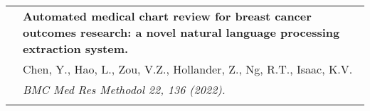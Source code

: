 \documentclass[letterpaper, 11pt]{article}
\begin{document}
\begin{longtable}{p{1.3in}p{4.8in}}
	\nohyphens{\color{Blue}{Publications}}
	 & \textbf{Automated medical chart review for breast cancer outcomes research: a novel natural language processing extraction system.}                                                                                                                                                                                                                                                       \\
	 & Chen, Y., Hao, L., Zou, V.Z., Hollander, Z., Ng, R.T., Isaac, K.V.                                                                                                                                                                                                                                                                                                                        \\
	 & \textit{BMC Med Res Methodol 22, 136 (2022).}                                                                                                                                                                                                                                                                                                                                             \\
	 &                                                                                                                                                                                                                                                                                                                                                                                           \\


\end{longtable}
\end{document}
